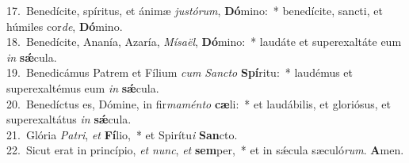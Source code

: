 {17.~}Benedícite, spíritus, et ánimæ \textit{ju}\textit{stó}\textit{rum}, \textbf{Dó}mino:~* benedícite, sancti, et húmiles cor\textit{de}, \textbf{Dó}mino.\\
{18.~}Benedícite, Ananía, Azaría, \textit{Mí}\textit{sa}\textit{ël}, \textbf{Dó}mino:~* laudáte et superexaltáte eum \textit{in} \textbf{sǽ}cula.\\
{19.~}Benedicámus Patrem et Fílium \textit{cum} \textit{San}\textit{cto} \textbf{Spí}ritu:~* laudémus et superexaltémus eum \textit{in} \textbf{sǽ}cula.\\
{20.~}Benedíctus es, Dómine, in fir\textit{ma}\textit{mén}\textit{to} \textbf{cæ}li:~* et laudábilis, et gloriósus, et superexaltátus \textit{in} \textbf{sǽ}cula.\\
{21.~}Glória \textit{Pa}\textit{tri}, \textit{et} \textbf{Fí}lio,~* et Spirítu\textit{i} \textbf{San}cto.\\
{22.~}Sicut erat in princípio, \textit{et} \textit{nunc}, \textit{et} \textbf{sem}per,~* et in sǽcula sæculó\textit{rum}. \textbf{A}men.\\
